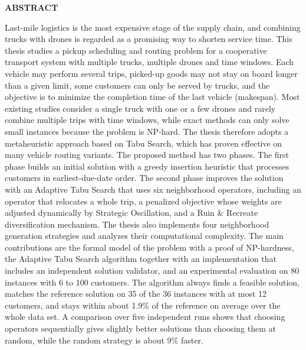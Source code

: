 \documentclass[../DoAn.tex]{subfiles}
\begin{document}
\begin{center}
    \Large{\textbf{ABSTRACT}}\\
\end{center}
\vspace{1cm}
Last-mile logistics is the most expensive stage of the supply chain, and combining trucks with drones is regarded as a promising way to shorten service time. This thesis studies a pickup scheduling and routing problem for a cooperative transport system with multiple trucks, multiple drones and time windows. Each vehicle may perform several trips, picked-up goods may not stay on board longer than a given limit, some customers can only be served by trucks, and the objective is to minimize the completion time of the last vehicle (makespan). Most existing studies consider a single truck with one or a few drones and rarely combine multiple trips with time windows, while exact methods can only solve small instances because the problem is NP-hard. The thesis therefore adopts a metaheuristic approach based on Tabu Search, which has proven effective on many vehicle routing variants. The proposed method has two phases. The first phase builds an initial solution with a greedy insertion heuristic that processes customers in earliest-due-date order. The second phase improves the solution with an Adaptive Tabu Search that uses six neighborhood operators, including an operator that relocates a whole trip, a penalized objective whose weights are adjusted dynamically by Strategic Oscillation, and a Ruin \& Recreate diversification mechanism. The thesis also implements four neighborhood generation strategies and analyzes their computational complexity. The main contributions are the formal model of the problem with a proof of NP-hardness, the Adaptive Tabu Search algorithm together with an implementation that includes an independent solution validator, and an experimental evaluation on 80 instances with 6 to 100 customers. The algorithm always finds a feasible solution, matches the reference solution on 35 of the 36 instances with at most 12 customers, and stays within about 1.9\% of the reference on average over the whole data set. A comparison over five independent runs shows that choosing operators sequentially gives slightly better solutions than choosing them at random, while the random strategy is about 9\% faster.
\end{document}
